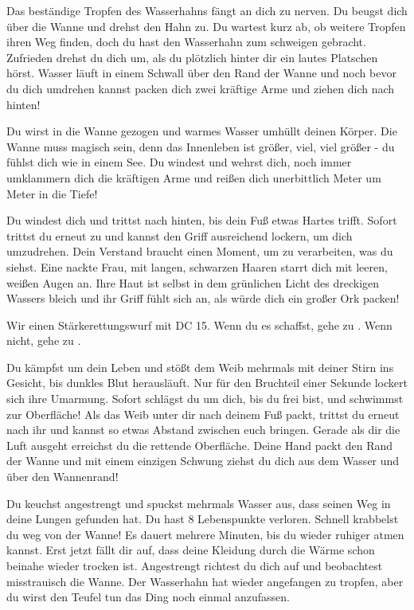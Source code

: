 Das beständige Tropfen des Wasserhahns fängt an dich zu nerven. Du beugst dich über die Wanne und drehst den Hahn zu. Du wartest kurz ab, ob weitere Tropfen ihren Weg finden, doch du hast den Wasserhahn zum schweigen gebracht. Zufrieden drehst du dich um, als du plötzlich hinter dir ein lautes Platschen hörst. Wasser läuft in einem Schwall über den Rand der Wanne und noch bevor du dich umdrehen kannst packen dich zwei kräftige Arme und ziehen dich nach hinten!

Du wirst in die Wanne gezogen und warmes Wasser umhüllt deinen Körper. Die Wanne muss magisch sein, denn das Innenleben ist größer, viel, viel größer - du fühlst dich wie in einem See. Du windest und wehrst dich, noch immer umklammern dich die kräftigen Arme und reißen dich unerbittlich Meter um Meter in die Tiefe!

Du windest dich und trittst nach hinten, bis dein Fuß etwas Hartes trifft. Sofort trittst du erneut zu und kannst den Griff ausreichend lockern, um dich umzudrehen. Dein Verstand braucht einen Moment, um zu verarbeiten, was du siehst. Eine nackte Frau, mit langen, schwarzen Haaren starrt dich mit leeren, weißen Augen an. Ihre Haut ist selbst in dem grünlichen Licht des dreckigen Wassers bleich und ihr Griff fühlt sich an, als würde dich ein großer Ork packen!

Wir einen Stärkerettungswurf mit DC 15. Wenn du es schaffst, gehe zu .
Wenn nicht, gehe zu .


Du kämpfst um dein Leben und stößt dem Weib mehrmals mit deiner Stirn ins Gesicht, bis dunkles Blut herausläuft. Nur für den Bruchteil einer Sekunde lockert sich ihre Umarmung. Sofort schlägst du um dich, bis du frei bist, und schwimmst zur Oberfläche! Als das Weib unter dir nach deinem Fuß packt, trittst du erneut nach ihr und kannst so etwas Abstand zwischen euch bringen. Gerade als dir die Luft ausgeht erreichst du die rettende Oberfläche. Deine Hand packt den Rand der Wanne und mit einem einzigen Schwung ziehst du dich aus dem Wasser und über den Wannenrand!

Du keuchst angestrengt und spuckst mehrmals Wasser aus, dass seinen Weg in deine Lungen gefunden hat. Du hast 8 Lebenspunkte verloren. Schnell krabbelst du weg von der Wanne! Es dauert mehrere Minuten, bis du wieder ruhiger atmen kannst. Erst jetzt fällt dir auf, dass deine Kleidung durch die Wärme schon beinahe wieder trocken ist. Angestrengt richtest du dich auf und beobachtest misstrauisch die Wanne. Der Wasserhahn hat wieder angefangen zu tropfen, aber du wirst den Teufel tun das Ding noch einmal anzufassen.

